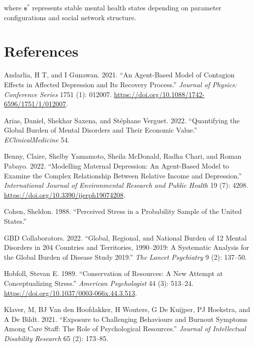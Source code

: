 \documentclass[
  letterpaper,
  DIV=11,
  numbers=noendperiod]{scrartcl}
\newlength{\cslhangindent}
\newenvironment{CSLReferences}[2] %
 {\begin{list}{}{%
  \setlength{\itemindent}{0pt}
  \setlength{\leftmargin}{0pt}
  \setlength{\parsep}{0pt}
  \ifodd #1
   \setlength{\leftmargin}{\cslhangindent}
   \setlength{\itemindent}{-1\cslhangindent}
  \fi
  \setlength{\itemsep}{#2\baselineskip}}}
 {\end{list}}
\begin{document}
where \(\mathbf{s}^*\) represents stable mental health states depending
on parameter configurations and social network structure.

\section*{References}\label{references}

\footnotesize

\label{refs}
\begin{CSLReferences}{1}{0}
Andarlia, H T, and I Gunawan. 2021. {``An Agent-Based Model of Contagion
Effects in Affected Depression and Its Recovery Process.''}
\emph{Journal of Physics: Conference Series} 1751 (1): 012007.
\url{https://doi.org/10.1088/1742-6596/1751/1/012007}.

Arias, Daniel, Shekhar Saxena, and Stéphane Verguet. 2022.
{``Quantifying the Global Burden of Mental Disorders and Their Economic
Value.''} \emph{EClinicalMedicine} 54.

Benny, Claire, Shelby Yamamoto, Sheila McDonald, Radha Chari, and Roman
Pabayo. 2022. {``Modelling Maternal Depression: An Agent-Based Model to
Examine the Complex Relationship Between Relative Income and
Depression.''} \emph{International Journal of Environmental Research and
Public Health} 19 (7): 4208.
\url{https://doi.org/10.3390/ijerph19074208}.

Cohen, Sheldon. 1988. {``Perceived Stress in a Probability Sample of the
United States.''}

GBD Collaborators. 2022. {``Global, Regional, and National Burden of 12
Mental Disorders in 204 Countries and Territories, 1990--2019: A
Systematic Analysis for the Global Burden of Disease Study 2019.''}
\emph{The Lancet Psychiatry} 9 (2): 137--50.

Hobfoll, Stevan E. 1989. {``Conservation of Resources: A New Attempt at
Conceptualizing Stress.''} \emph{American Psychologist} 44 (3): 513--24.
\url{https://doi.org/10.1037/0003-066x.44.3.513}.

Klaver, M, BJ Van den Hoofdakker, H Wouters, G De Kuijper, PJ Hoekstra,
and A De Bildt. 2021. {``Exposure to Challenging Behaviours and Burnout
Symptoms Among Care Staff: The Role of Psychological Resources.''}
\emph{Journal of Intellectual Disability Research} 65 (2): 173--85.


\end{CSLReferences}
\end{document}
